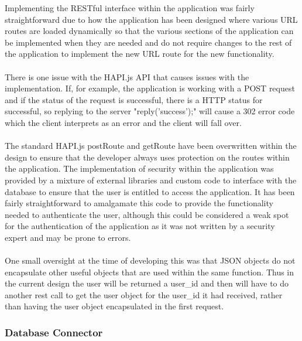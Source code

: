 Implementing the RESTful interface within the application was fairly straightforward due to how the application has been designed where various URL routes are loaded dynamically so that the various sections of the application can be implemented when they are needed and do not require changes to the rest of the application to implement the new URL route for the new functionality.\\
\\
There is one issue with the HAPI.js API that causes issues with the implementation. If, for example, the application is working with a POST request and if the status of the request is successful, there is a HTTP status for successful, so replying to the server "reply('success');" will cause a 302 error code which the client interprets as an error and the client will fall over.\\
\\
The standard HAPI.js postRoute and getRoute have been overwritten within the design to ensure that the developer always uses protection on the routes within the application. The implementation of security within the application was provided by a mixture of external libraries and custom code to interface with the database to ensure that the user is entitled to access the application. It has been fairly straightforward to amalgamate this code to provide the functionality needed to authenticate the user, although this could be considered a weak spot for the authentication of the application as it was not written by a security expert and may be prone to errors.\\
\\
One small oversight at the time of developing this was that JSON objects do not encapsulate other useful objects that are used within the same function. Thus in the current design the user will be returned a user\_id and then will have to do another rest call to get the user object for the user\_id it had received, rather than having the user object encapsulated in the first request.

\subsubsection{Database Connector}

